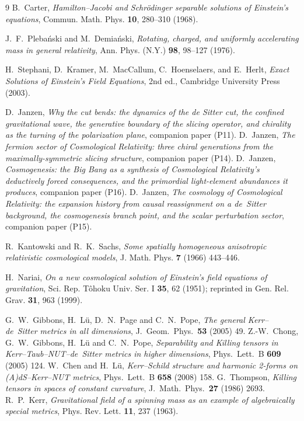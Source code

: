 \documentclass[11pt,a4paper]{article}
\theoremstyle{definition}
\begin{document}
\begin{thebibliography}{9}
B.~Carter,
\emph{Hamilton--Jacobi and Schr\"odinger separable solutions of Einstein's equations},
Commun. Math. Phys. \textbf{10}, 280--310 (1968).

J.~F.~Plebański and M.~Demiański,
\emph{Rotating, charged, and uniformly accelerating mass in general relativity},
Ann. Phys. (N.Y.) \textbf{98}, 98--127 (1976).

H.~Stephani, D.~Kramer, M.~MacCallum, C.~Hoenselaers, and E.~Herlt,
\emph{Exact Solutions of Einstein's Field Equations},
2nd ed., Cambridge University Press (2003).

 D.~Janzen, \emph{Why the cut bends: the dynamics of the de Sitter cut, the confined gravitational wave, the generative boundary of the slicing operator, and chirality as the turning of the polarization plane}, companion paper (P11).
 D.~Janzen, \emph{The fermion sector of Cosmological Relativity: three chiral generations from the maximally-symmetric slicing structure}, companion paper (P14).
 D.~Janzen, \emph{Cosmogenesis: the Big Bang as a synthesis of Cosmological Relativity's deductively forced consequences, and the primordial light-element abundances it produces}, companion paper (P16).
 D.~Janzen, \emph{The cosmology of Cosmological Relativity: the expansion history from causal reassignment on a de~Sitter background, the cosmogenesis branch point, and the scalar perturbation sector}, companion paper (P15).

R.~Kantowski and R.~K.~Sachs,
\emph{Some spatially homogeneous anisotropic relativistic cosmological models},
J. Math. Phys. \textbf{7} (1966) 443--446.

H.~Nariai,
\emph{On a new cosmological solution of Einstein's field equations of gravitation},
Sci. Rep. T\^ohoku Univ. Ser. I \textbf{35}, 62 (1951); reprinted in Gen. Rel. Grav. \textbf{31}, 963 (1999).

 G.~W.~Gibbons, H.~L\"u, D.~N.~Page and C.~N.~Pope, \emph{The general Kerr--de~Sitter metrics in all dimensions}, J.\ Geom.\ Phys.\ \textbf{53} (2005) 49.
 Z.-W.~Chong, G.~W.~Gibbons, H.~L\"u and C.~N.~Pope, \emph{Separability and Killing tensors in Kerr--Taub--NUT--de~Sitter metrics in higher dimensions}, Phys.\ Lett.\ B \textbf{609} (2005) 124.
 W.~Chen and H.~L\"u, \emph{Kerr--Schild structure and harmonic 2-forms on (A)dS--Kerr--NUT metrics}, Phys.\ Lett.\ B \textbf{658} (2008) 158.
 G.~Thompson, \emph{Killing tensors in spaces of constant curvature}, J.\ Math.\ Phys.\ \textbf{27} (1986) 2693.
R.~P.~Kerr,
\emph{Gravitational field of a spinning mass as an example of algebraically special metrics},
Phys. Rev. Lett. \textbf{11}, 237 (1963).


\end{thebibliography}
\end{document}
